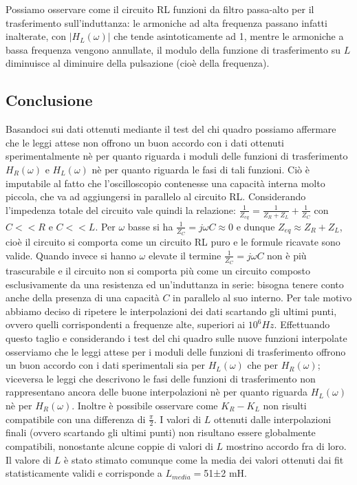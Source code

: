 \documentclass[a4paper]{article}
\begin{document}
Possiamo osservare come il circuito RL funzioni da filtro passa-alto per il trasferimento sull'induttanza: le armoniche ad alta frequenza passano infatti inalterate, con $|H_L(\omega)|$ che tende asintoticamente ad 1, mentre le armoniche a bassa frequenza vengono annullate, il modulo della funzione di trasferimento su $L$ diminuisce al diminuire della pulsazione (cioè della frequenza).


\subsection {Conclusione}
Basandoci sui dati ottenuti mediante il test del chi quadro possiamo affermare che le leggi attese non offrono un buon accordo con i dati ottenuti sperimentalmente nè per quanto riguarda i moduli delle funzioni di trasferimento $H_R(\omega)$ e $H_L(\omega)$ nè per quanto riguarda le fasi di tali funzioni. Ciò è imputabile al fatto che l'oscilloscopio contenesse una capacità interna molto piccola, che va ad aggiungersi in parallelo al circuito RL. Considerando l'impedenza totale del circuito vale quindi la relazione: $\frac{1}{Z_{eq}}=\frac{1}{Z_R+Z_L}+\frac{1}{Z_C}$ con $C<<R$ e $C<<L$. Per $\omega$ basse si ha $\frac{1}{Z_C}=j\omega C \approx 0 $ e dunque $Z_{eq} \approx Z_R+Z_L$, cioè il circuito si comporta come un circuito RL puro e le formule ricavate sono valide. Quando invece si hanno $\omega$ elevate il termine $\frac{1}{Z_C}=j\omega C$ non è più trascurabile e il circuito non si comporta più come un circuito composto esclusivamente da una resistenza ed un'induttanza in serie: bisogna tenere conto anche della presenza di una capacità $C$ in parallelo al suo interno. Per tale motivo abbiamo deciso di ripetere le interpolazioni dei dati scartando gli ultimi punti, ovvero quelli corrispondenti a frequenze alte, superiori ai 
 $10^6 Hz$. Effettuando questo taglio e considerando i test del chi quadro sulle nuove funzioni interpolate osserviamo che le leggi attese per i moduli delle funzioni di trasferimento offrono un buon accordo con i dati sperimentali sia per $H_L(\omega)$ che per $H_R(\omega)$; viceversa le leggi che descrivono le fasi delle funzioni di trasferimento non rappresentano ancora delle buone interpolazioni nè per quanto riguarda $H_L(\omega)$ nè per $H_R(\omega)$. Inoltre è possibile osservare come $K_R - K_L$ non risulti compatibile con una differenza di $\frac{\pi}{2}$.
 I valori di $L$ ottenuti dalle interpolazioni finali (ovvero scartando gli ultimi punti) non risultano essere globalmente compatibili, nonostante alcune coppie di valori di $L$ mostrino accordo fra di loro. Il valore di $L$ è stato stimato comunque come la media dei valori ottenuti dai fit statisticamente validi e corrisponde a $L_{media}=$51±2 mH.
\end{document}
